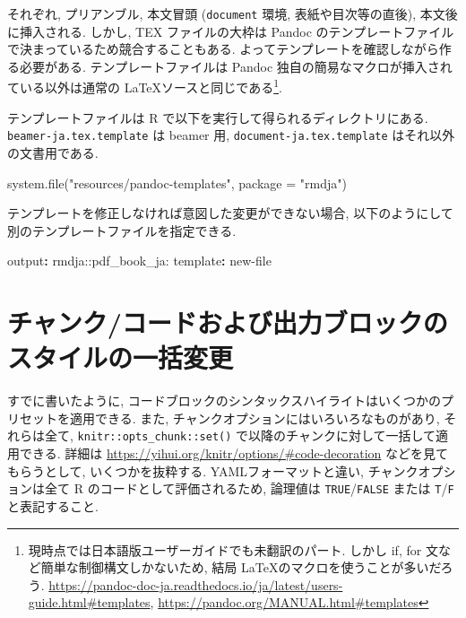 \documentclass[
  xelatex,ja=standard,jafont=noto]{bxjsbook}
\newenvironment{Shaded}{\begin{snugshade}}{\end{snugshade}}
\newcommand{\AttributeTok}[1]{\textcolor[rgb]{0.77,0.63,0.00}{#1}}
\newcommand{\FunctionTok}[1]{\textcolor[rgb]{0.00,0.00,0.00}{#1}}
\newcommand{\KeywordTok}[1]{\textcolor[rgb]{0.13,0.29,0.53}{\textbf{#1}}}
\newcommand{\NormalTok}[1]{#1}
\newcommand{\StringTok}[1]{\textcolor[rgb]{0.31,0.60,0.02}{#1}}
\theoremstyle{definition}
\theoremstyle{definition}
\theoremstyle{definition}
\theoremstyle{definition}
\theoremstyle{remark}
\begin{document}
それぞれ, プリアンブル, 本文冒頭 (\texttt{document} 環境,
表紙や目次等の直後), 本文後に挿入される. しかし, TEX ファイルの大枠は
Pandoc のテンプレートファイルで決まっているため競合することもある.
よってテンプレートを確認しながら作る必要がある. テンプレートファイルは
Pandoc 独自の簡易なマクロが挿入されている以外は通常の
\LaTeX ソースと同じである\footnote{現時点では日本語版ユーザーガイドでも未翻訳のパート.
  しかし if, for 文など簡単な制御構文しかないため, 結局
  \LaTeX のマクロを使うことが多いだろう.
  \url{https://pandoc-doc-ja.readthedocs.io/ja/latest/users-guide.html\#templates},
  \url{https://pandoc.org/MANUAL.html\#templates}}.

テンプレートファイルは R で以下を実行して得られるディレクトリにある.
\texttt{beamer-ja.tex.template} は beamer 用,
\texttt{document-ja.tex.template} はそれ以外の文書用である.

\begin{Shaded}
\begin{Highlighting}[numbers=left,,]
\FunctionTok{system.file}\NormalTok{(}\StringTok{"resources/pandoc{-}templates"}\NormalTok{, }\AttributeTok{package =} \StringTok{"rmdja"}\NormalTok{)}
\end{Highlighting}
\end{Shaded}

テンプレートを修正しなければ意図した変更ができない場合,
以下のようにして別のテンプレートファイルを指定できる.

\begin{Shaded}
\begin{Highlighting}[]
\FunctionTok{output}\KeywordTok{:}\AttributeTok{ rmdja::pdf\_book\_ja:}
\AttributeTok{  }\FunctionTok{template}\KeywordTok{:}\AttributeTok{ new{-}file}
\end{Highlighting}
\end{Shaded}

\hypertarget{ux30c1ux30e3ux30f3ux30afux30b3ux30fcux30c9ux304aux3088ux3073ux51faux529bux30d6ux30edux30c3ux30afux306eux30b9ux30bfux30a4ux30ebux306eux4e00ux62ecux5909ux66f4}{%
\section{チャンク/コードおよび出力ブロックのスタイルの一括変更}\label{ux30c1ux30e3ux30f3ux30afux30b3ux30fcux30c9ux304aux3088ux3073ux51faux529bux30d6ux30edux30c3ux30afux306eux30b9ux30bfux30a4ux30ebux306eux4e00ux62ecux5909ux66f4}}

すでに書いたように,
コードブロックのシンタックスハイライトはいくつかのプリセットを適用できる.
また, チャンクオプションにはいろいろなものがあり, それらは全て,
\texttt{knitr::opts\_chunk::set()}
で以降のチャンクに対して一括して適用できる. 詳細は
\url{https://yihui.org/knitr/options/\#code-decoration}
などを見てもらうとして, いくつかを抜粋する. YAMLフォーマットと違い,
チャンクオプションは全て R のコードとして評価されるため, 論理値は
\texttt{TRUE}/\texttt{FALSE} または \texttt{T}/\texttt{F}と表記すること.
\end{document}
